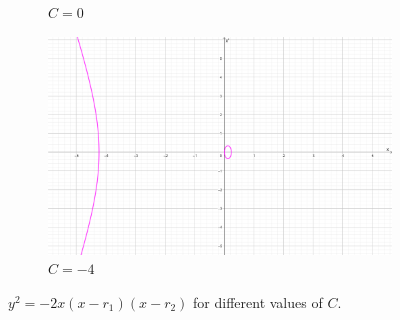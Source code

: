 \documentclass{article}
\begin{document}
\begin{figure}
\begin{subfigure}{0.45\textwidth}
  \caption{$C = 0$ }
\end{subfigure}\hfill%
\begin{subfigure}{0.45\textwidth}
  \includegraphics[width=\textwidth]{C=-4.png}
  \caption{$C=-4$}
  \end{subfigure}
\caption{\small{$y^2 = -2x(x-r_1)(x-r_2)$ for different values of $C$.}}
\end{figure}


\newpage
\end{document}
